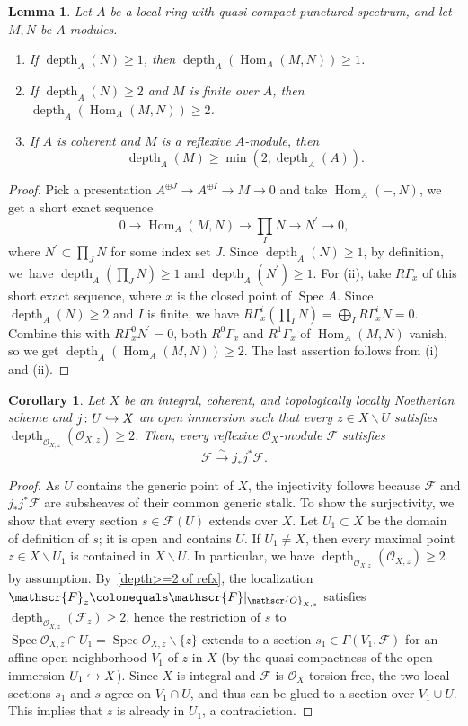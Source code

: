 \documentclass[JEP,XML,SOM,Unicode,published]{cedram}
\newenvironment{enumeratei}
{\bgroup\def\theenumi{\roman{enumi}}\def\theenumii{\arabic{enumii}}\begin{enumerate}}
{\end{enumerate}\egroup}
\newcommand\hto{\mathrel{\lhook\joinrel\to}}
\let\backslash\smallsetminus
\newcommand{\GG}{\Gamma}
\newcommand{\sF}{\mathscr{F}}
\newcommand{\sO}{\mathscr{O}}
\let\ce\colonequals
\newcommand{\pr}{^{\prime}}
\newcommand{\isoto}{\overset{\sim}{\longrightarrow}}
\DeclareMathOperator{\Spec}{Spec}
\DeclareMathOperator{\Hom}{Hom}
\DeclareMathOperator{\depth}{depth}
\newcommand{\bpf}{\begin{proof}}
\newcommand{\epf}{\end{proof}}
\newcommand{\bcor}{\begin{cor}}
\newcommand{\ecor}{\end{cor}}
\newcommand{\blem}{\begin{lemma}}
\newcommand{\elem}{\end{lemma}}
\newcommand{\benumr}{\begin{enumeratei}}
\newcommand{\eenumr}{\end{enumeratei}}
\theoremstyle{plain}
\newtheorem{cor}[subsection]{Corollary}
\newtheorem{lemma}[subsection]{Lemma}
\theoremstyle{definition}
\begin{document}
\blem\label{dep-inh}
Let $A$ be a local ring with quasi-compact punctured spectrum, and let $M,N$ be $A$\nobreakdash-mod\-ules.
\benumr
\item If $\depth_A(N)\geq 1$, then $\depth_A(\Hom_A(M,N))\geq 1$.
\item If $\depth_A(N)\geq 2$ and $M$ is finite over $A$, then $\depth_A(\Hom_A(M,N))\geq 2$.
\item \label{depth>=2 of refx} {If $A$ is coherent and $M$ is a reflexive $A$\nobreakdash-mod\-ule, then }\[
\depth_A(M)\ge \min(2, \depth_A(A)).
\]
\eenumr
\elem
\bpf
Pick a presentation $A^{\oplus J}\to A^{\oplus I}\to M\to 0$ and take $\Hom_A(-,N)$, we get a short exact sequence
\[
0\to \Hom_A(M,N)\to \prod_I N\to N\pr\to 0,
\]
where $N\pr\subset \prod_J N$ for some index set $J$.
Since $\depth_A(N)\geq 1$, by definition, we~have $\depth_A(\prod_J N)\geq 1$ and $\depth_A(N\pr)\geq 1$.
For (ii), take $R\GG_{x}$ of this short exact sequence, where $x$ is the closed point of $\Spec A$.
Since $\depth_A(N)\geq 2$ and $I$ is finite, we have $R\GG^i_{x}(\prod_I N)=\bigoplus_I R\GG^i_{x}N=0$.
Combine this with $R\GG^0_{x}N\pr=0$, both $R^0\GG_{x}$ and $R^1\GG_{x}$ of $\Hom_A(M,N)$ vanish, so we get $\depth_A(\Hom_A(M,N))\geq 2$. The last assertion follows from (i) and (ii).
\epf
\bcor\label{ref-dep-2}
Let $X$ be an integral, coherent, {and topologically locally Noetherian} scheme and $j\colon U\hto X$ an open immersion such that every $z\in X\backslash U$ satisfies $\depth_{\sO_{X,z}}(\sO_{X,z})\geq 2$.
Then, every reflexive $\sO_X$\nobreakdash-mod\-ule $\sF$ satisfies
\[
\sF\isoto j_{\ast}j^{\ast}\sF.
\]
\ecor
\bpf
As $U$ contains the generic point of $X$, the injectivity follows because $\sF$ and $j_{\ast}j^{\ast}\sF$ are subsheaves of their common generic stalk.
To show the surjectivity, we show that every section $s\in \sF(U)$ extends over $X$.
Let $U_1\subset X$ be the domain of definition of $s$; it is open and contains $U$. If $U_1\neq X$, then every maximal point $z\in X\backslash U_1$ is contained in $X\backslash U$. In particular, we have $\depth_{\sO_{X,z}}(\sO_{X,z})\geq 2$ by assumption.
By~\eqref{depth>=2 of refx}, the localization $\sF_z\ce \sF|_{\sO_{X,z}}$ satisfies $\depth_{\sO_{X,z}}(\sF_z)\geq 2$, hence the restriction of $s$ to $\Spec \sO_{X,z}\cap U_1=\Spec \sO_{X,z}\backslash \{z\}$ extends to a section $s_1\in \GG(V_1, \sF)$ for an affine open neighborhood $V_1$ of $z$ in $X$ (by the quasi-compactness of the open immersion $U_1\hto X$).
Since $X$ is integral and $\sF$ is $\sO_X$-torsion-free, the two local sections $s_1$ and $s$ agree on $V_1\cap U$, and thus can be glued to a section over $V_1\cup U$.
This implies that $z$ is already in $U_1$, a contradiction.
\epf
\end{document}
